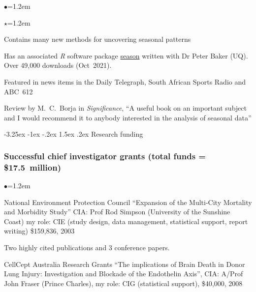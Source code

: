 \documentclass[a4paper,11pt]{article}
\makeatletter
\renewcommand\subsection{\@startsection{subsection}{2}{\z@}%
                                       {-3.25ex \@plus -1ex \@minus -.2ex}%
                                       {1.5ex \@plus .2ex}%
                                   {\normalfont\normalsize\bfseries\color{blue}}}
\renewcommand{\labelitemi}{$\bullet$}
\renewcommand{\labelitemii}{$\star$}
\makeatother
\begin{document}
\begin{raggedright}
\begin{list}{\labelitemi}{\leftmargin=1.2em}
\begin{list}{\labelitemii}{\leftmargin=1.2em}
\item Contains many new methods for uncovering seasonal patterns
\item Has an associated \textit{R} software package \href{http://cran.r-project.org/web/packages/season/index.html}{season} written with Dr Peter Baker (UQ). Over 49,000 downloads (Oct~2021).
\item Featured in news items in the Daily Telegraph, South African Sports Radio and ABC~612
\item Review by M.\ C.\ Borja in \textit{Significance}, ``A useful book on an important subject and I would recommend it to anybody interested in the analysis of seasonal data''
\end{list}
\end{list}

\subsection{Research funding}

\subsubsection*{Successful chief investigator grants (total funds = \$17.5~million)} %

\begin{list}{\labelitemi}{\leftmargin=1.2em}\addtolength{\itemsep}{-0.5\baselineskip}

\item National Environment Protection Council ``Expansion of the Multi-City Mortality and Morbidity Study'' CIA: Prof Rod Simpson (University of the Sunshine Coast) my role: CIE (study design, data management, statistical support, report writing) \$159,836, 2003

    Two highly cited publications  and 3 conference papers.%

\item CellCept Australia Research Grants ``The implications of Brain Death in Donor Lung Injury: Investigation and Blockade of the Endothelin Axis'', CIA: A/Prof John Fraser (Prince Charles), my role: CIG (statistical support), \$40,000, 2008


\end{list}
\end{raggedright}
\end{document}
